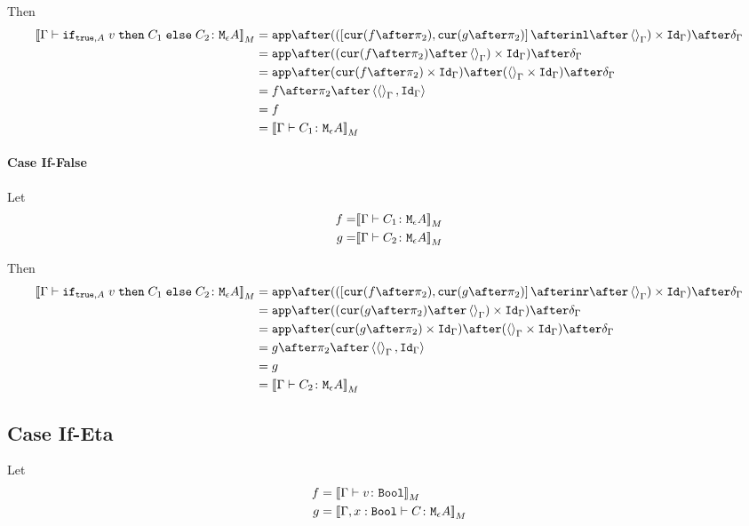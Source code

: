 {    Then
    \begin{equation}
        \begin{split}
            \deno{\gtyperelation{\ifthenelse{\t}{A}{v}{C_1}{C_2}}{\mea}} & = \ifMorph{\inl\after\term{\G}}{f}{g} \\
            & = \app\after((\cur{f\after\pp}\after\term{\G})\times\idg)\after\diag{\G}\\
            & = \app\after(\cur{f\after\pp}\times\idg)\after(\term{\G}\times\idg)\after\diag{\G}\\
            & = f\after\pp\after\pr{\term{\G}}{\idg}\\
            & = f \\
            & = \deno{\gtyperelation{C_1}{\mea}}\\
        \end{split}
    \end{equation}


    \paragraph{Case If-False}
    Let
    \begin{align}
        f = &{\bf [\![}\Gamma \vdash C_1 \colon \texttt{M}_{\epsilon}{A}{\bf ]\!]}_M\\
        g = &{\bf [\![}\Gamma \vdash C_2 \colon \texttt{M}_{\epsilon}{A}{\bf ]\!]}_M\\
    \end{align}

    Then
    \begin{equation}
        \begin{split}
            \deno{\gtyperelation{\ifthenelse{\t}{A}{v}{C_1}{C_2}}{\mea}} & = \ifMorph{\inr\after\term{\G}}{f}{g} \\
            & = \app\after((\cur{g\after\pp}\after\term{\G})\times\idg)\after\diag{\G}\\
            & = \app\after(\cur{g\after\pp}\times\idg)\after(\term{\G}\times\idg)\after\diag{\G}\\
            & = g\after\pp\after\pr{\term{\G}}{\idg}\\
            & = g \\
            & = \deno{\gtyperelation{C_2}{\mea}}\\
        \end{split}
    \end{equation}

    \subsection{Case If-Eta}
        Let 
        \begin{align}
            f & = {\bf [\![}\Gamma \vdash v \colon \texttt{Bool}{\bf ]\!]}_M \\
            g & = {\bf [\![}\Gamma, x: \texttt{Bool} \vdash C \colon \texttt{M}_{\epsilon}{A}{\bf ]\!]}_M \\
        \end{align}


}
